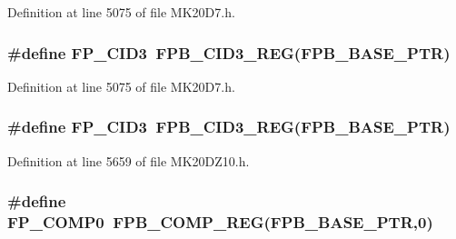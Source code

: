 Definition at line 5075 of file M\+K20\+D7.\+h.

\subsubsection[{\texorpdfstring{F\+P\+\_\+\+C\+I\+D3}{FP_CID3}}]{\setlength{\rightskip}{0pt plus 5cm}\#define F\+P\+\_\+\+C\+I\+D3~{\bf F\+P\+B\+\_\+\+C\+I\+D3\+\_\+\+R\+EG}({\bf F\+P\+B\+\_\+\+B\+A\+S\+E\+\_\+\+P\+TR})}\hypertarget{group___f_p_b___register___accessor___macros_gacb056c6cfc1741d7d65a4ceb25b0c9ff}{}\label{group___f_p_b___register___accessor___macros_gacb056c6cfc1741d7d65a4ceb25b0c9ff}


Definition at line 5075 of file M\+K20\+D7.\+h.

\subsubsection[{\texorpdfstring{F\+P\+\_\+\+C\+I\+D3}{FP_CID3}}]{\setlength{\rightskip}{0pt plus 5cm}\#define F\+P\+\_\+\+C\+I\+D3~{\bf F\+P\+B\+\_\+\+C\+I\+D3\+\_\+\+R\+EG}({\bf F\+P\+B\+\_\+\+B\+A\+S\+E\+\_\+\+P\+TR})}\hypertarget{group___f_p_b___register___accessor___macros_gacb056c6cfc1741d7d65a4ceb25b0c9ff}{}\label{group___f_p_b___register___accessor___macros_gacb056c6cfc1741d7d65a4ceb25b0c9ff}


Definition at line 5659 of file M\+K20\+D\+Z10.\+h.

\subsubsection[{\texorpdfstring{F\+P\+\_\+\+C\+O\+M\+P0}{FP_COMP0}}]{\setlength{\rightskip}{0pt plus 5cm}\#define F\+P\+\_\+\+C\+O\+M\+P0~{\bf F\+P\+B\+\_\+\+C\+O\+M\+P\+\_\+\+R\+EG}({\bf F\+P\+B\+\_\+\+B\+A\+S\+E\+\_\+\+P\+TR},0)}\hypertarget{group___f_p_b___register___accessor___macros_gad8c0ae3c9feb5260f6386178437e6836}{}\label{group___f_p_b___register___accessor___macros_gad8c0ae3c9feb5260f6386178437e6836}


